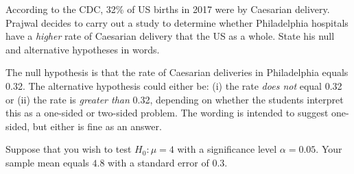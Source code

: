 \documentclass[addpoints,12pt]{exam}
\begin{document}
\begin{questions}




\question According to the CDC, 32\% of US births in 2017 were by Caesarian delivery. Prajwal decides to carry out a study to determine whether Philadelphia hospitals have a \emph{higher} rate of Caesarian delivery that the US as a whole. State his null and alternative hypotheses in words. 
\begin{solution}
  The null hypothesis is that the rate of Caesarian deliveries in Philadelphia equals 0.32. The alternative hypothesis could either be: (i) the rate \emph{does not} equal 0.32 or (ii) the rate is \emph{greater than } 0.32, depending on whether the students interpret this as a one-sided or two-sided problem. The wording is intended to suggest one-sided, but either is fine as an answer.
\end{solution}

\question Suppose that you wish to test $H_0\colon \mu = 4$ with a significance level $\alpha = 0.05$. Your sample mean equals $4.8$ with a standard error of $0.3$.
\end{questions}
\end{document}
